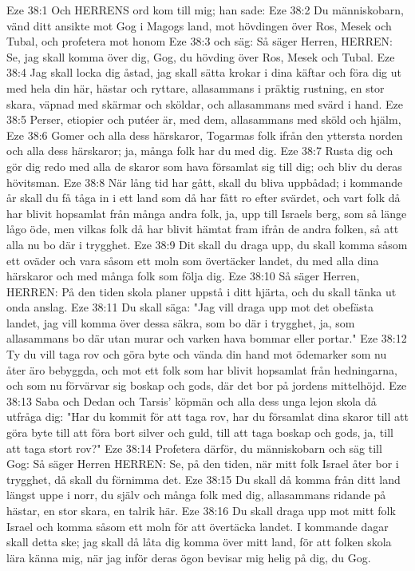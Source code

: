 Eze 38:1  Och HERRENS ord kom till mig; han sade:
Eze 38:2  Du människobarn, vänd ditt ansikte mot Gog i Magogs land, mot hövdingen över Ros, Mesek och Tubal, och profetera mot honom
Eze 38:3  och säg: Så säger Herren, HERREN: Se, jag skall komma över dig, Gog, du hövding över Ros, Mesek och Tubal.
Eze 38:4  Jag skall locka dig åstad, jag skall sätta krokar i dina käftar och föra dig ut med hela din här, hästar och ryttare, allasammans i präktig rustning, en stor skara, väpnad med skärmar och sköldar, och allasammans med svärd i hand.
Eze 38:5  Perser, etiopier och putéer är, med dem, allasammans med sköld och hjälm,
Eze 38:6  Gomer och alla dess härskaror, Togarmas folk ifrån den yttersta norden och alla dess härskaror; ja, många folk har du med dig.
Eze 38:7  Rusta dig och gör dig redo med alla de skaror som hava församlat sig till dig; och bliv du deras hövitsman.
Eze 38:8  När lång tid har gått, skall du bliva uppbådad; i kommande år skall du få tåga in i ett land som då har fått ro efter svärdet, och vart folk då har blivit hopsamlat från många andra folk, ja, upp till Israels berg, som så länge lågo öde, men vilkas folk då har blivit hämtat fram ifrån de andra folken, så att alla nu bo där i trygghet.
Eze 38:9  Dit skall du draga upp, du skall komma såsom ett oväder och vara såsom ett moln som övertäcker landet, du med alla dina härskaror och med många folk som följa dig.
Eze 38:10  Så säger Herren, HERREN: På den tiden skola planer uppstå i ditt hjärta, och du skall tänka ut onda anslag.
Eze 38:11  Du skall säga: "Jag vill draga upp mot det obefästa landet, jag vill komma över dessa säkra, som bo där i trygghet, ja, som allasammans bo där utan murar och varken hava bommar eller portar."
Eze 38:12  Ty du vill taga rov och göra byte och vända din hand mot ödemarker som nu åter äro bebyggda, och mot ett folk som har blivit hopsamlat från hedningarna, och som nu förvärvar sig boskap och gods, där det bor på jordens mittelhöjd.
Eze 38:13  Saba och Dedan och Tarsis' köpmän och alla dess unga lejon skola då utfråga dig: "Har du kommit för att taga rov, har du församlat dina skaror till att göra byte till att föra bort silver och guld, till att taga boskap och gods, ja, till att taga stort rov?"
Eze 38:14  Profetera därför, du människobarn och säg till Gog: Så säger Herren HERREN: Se, på den tiden, när mitt folk Israel åter bor i trygghet, då skall du förnimma det.
Eze 38:15  Du skall då komma från ditt land längst uppe i norr, du själv och många folk med dig, allasammans ridande på hästar, en stor skara, en talrik här.
Eze 38:16  Du skall draga upp mot mitt folk Israel och komma såsom ett moln för att övertäcka landet. I kommande dagar skall detta ske; jag skall då låta dig komma över mitt land, för att folken skola lära känna mig, när jag inför deras ögon bevisar mig helig på dig, du Gog.
